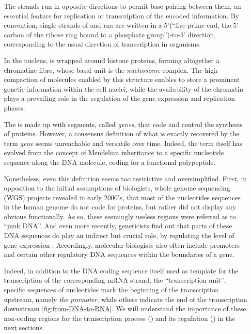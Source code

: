 The strands run in opposite directions to permit base pairing between them, an essential feature for replication or transcription of the encoded information.  By convention, single strands of  and \gls{rna} are written in a 5'(\enquote{five-prime end, the 5' carbon of the ribose ring bound to a phosphate group})-to-3' direction, corresponding to the usual direction of transcription in organisms.

In the nucleus, is wrapped around histone proteins, forming altogether a chromatine fibre, whose basal unit is the \textit{nucleosome} complex. The high compaction of  molecules enabled by this structure enables to store a prominent genetic information within the cell nuclei, while the availability of the chromatin plays a prevailing role in the regulation of the gene expression and replication phases.


The  is made up with segments, called \textit{genes}, that code and control the synthesis of proteins. However, a consensus definition of what is exactly recovered by the term \textit{gene} seems unreachable and versatile over time. Indeed, the term itself has evolved from the concept of Mendelian inheritance to a specific nucleotide sequence along the DNA molecule, coding for a functional polypeptide. 

Nonetheless, even this definition seems too restrictive and oversimplified. First, in opposition to the initial assumptions of biologists,  whole genome sequencing (WGS) projects revealed in early 2000's, that most of the nucleotides sequences in the human genome do not code for proteins, but rather did not display any obvious functionally. As so, these seemingly useless regions were referred as to \enquote{junk DNA}. And even more recently, geneticists find out that parts of these DNA sequences do play an indirect but crucial role, by regulating the level of gene expression . Accordingly, molecular biologists also often include promoters and certain other regulatory DNA sequences within the boundaries of a gene.

Indeed, in addition to the DNA coding sequence itself used as template for the transcription of the corresponding mRNA strand, the \enquote{transcription unit}, specific sequences of nucleotides mark the beginning of the transcription upstream, namely \textit{the promoter}, while others indicate the end of the transcription downstream \cref{fig:from-DNA-to-RNA}. We will understand the importance of these non-coding regions for the transcription process () and its regulation () in the next sections.

